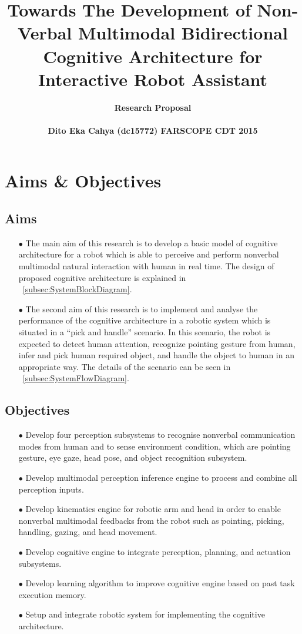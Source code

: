 \documentclass[11pt]{article}
\author{\bf \LARGE Research Proposal \\ \\ \bf Dito Eka Cahya (dc15772) FARSCOPE CDT 2015}
\date{}
\begin{document}
\title{\bf Towards The Development of Non-Verbal Multimodal Bidirectional Cognitive Architecture for Interactive Robot Assistant}
\maketitle
	\section{Aims \& Objectives}
		\subsection{Aims}
			\begin{itemize}
				\item[$\bullet$]The main aim of this research is to develop a basic model of cognitive architecture for a robot which is able to perceive and perform nonverbal multimodal natural interaction with human in real time. The design of proposed cognitive architecture is explained in ~\autoref{subsec:SystemBlockDiagram}.
				\item[$\bullet$]The second aim of this research is to implement and analyse the performance of the cognitive architecture in a robotic system which is situated in a “pick and handle” scenario. In this scenario, the robot is expected to detect human attention, recognize pointing gesture from human, infer and pick human required object, and handle the object to human in an appropriate way. The details of the scenario can be seen in ~\autoref{subsec:SystemFlowDiagram}.
			\end{itemize}
		\subsection{Objectives}
			\begin{itemize}
				\item[$\bullet$]Develop four perception subsystems to recognise nonverbal communication modes from human and to sense environment condition, which are pointing gesture, eye gaze, head pose, and object recognition subsystem.
				\item[$\bullet$]Develop multimodal perception inference engine to process and combine all perception inputs.
				\item[$\bullet$]Develop kinematics engine for robotic arm and head in order to enable nonverbal multimodal feedbacks from the robot such as pointing, picking, handling, gazing, and head movement.
				\item[$\bullet$]Develop cognitive engine to integrate perception, planning, and actuation subsystems.
				\item[$\bullet$]Develop learning algorithm to improve cognitive engine based on past task execution memory.
				\item[$\bullet$]Setup and integrate robotic system for implementing the cognitive architecture.
			\end{itemize}
\end{document}
